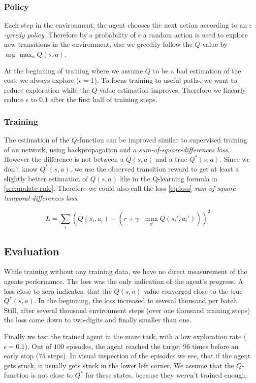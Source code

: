 \documentclass[a4paper,14pt]{article}
\begin{document}
\subsubsection*{Policy}

Each step in the environment, the agent chooses the next action according to an
$\epsilon$\textit{-greedy policy}.
Therefore by a probability of $\epsilon$ a random action is used to explore new
transitions in the environment, else we greedily follow the
$Q$-value by $\arg \max_a Q(s, a)$.

At the beginning of training where we assume $Q$ to be a bad estimation of the cost, we always explore ($\epsilon = 1$).
To focus training to useful paths, we want to reduce exploration while the
$Q$-value estimation improves.
Therefore we linearly reduce $\epsilon$ to $0.1$ after the first half of
training steps.

\subsubsection*{Training}

The estimation of the $Q$-function can be improved similar to supervised
training of an network, using backpropagation and a
\textit{sum-of-square-differences loss}.
However the difference is not between a $Q(s,a)$ and a true $Q^*(s,a)$.
Since we don't know $Q^*(s,a)$, we use the observed transition reward to get at least a
slightly better estimation of $Q(s,a)$ like in the Q-learning formula in
\autoref{sec:update-rule}.
Therefore we could also call the loss \autoref{eq:loss} \textit{sum-of-square-temporal-differences
loss}.

\begin{equation*}
  \label{eq:loss}
  L = \sum_i(Q(s_i, a_i) - (r + \gamma \cdot \max_{a'}Q(s_i', a_i')))^2
\end{equation*}

\subsection{Evaluation}

While training without any training data, we have no direct measurement of the agents
performance. The loss was the only indication of the agent's progress.
A loss close to zero indicates, that the $Q(s, a)$ value converged close to the
true $Q^*(s, a)$.
In the beginning, the loss increased to several thousand per batch. Still, after
several thousand environment steps (over one thousand training steps)
the loss came down to two-digits and finally smaller than one.

Finally we test the trained agent in the maze task, with a low
exploration rate ($\epsilon = 0.1$).
Out of $100$ episodes, the agent reached the target $96$ times before an early stop
($75$ steps).
In visual inspection of the episodes we see, that if the agent gets stuck, it usually gets
stuck in the lower left corner. We assume that the $Q$-function is not close to
$Q^*$ for these states, because they weren't trained enough.

\end{document}
